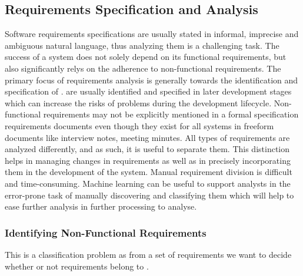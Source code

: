 \subsection{Requirements Specification and Analysis}

Software requirements specifications are usually stated in informal, imprecise and ambiguous natural language, thus analyzing them is a challenging task. 
The success of a system does not solely depend on its functional requirements, but also significantly relys on the
adherence to non-functional requirements. The primary focus of requirements analysis is
generally towards the identification and specification of \FR. \NFR are usually
identified and specified in later development stages which can increase the
risks of problems during the development lifecycle. Non-functional requirements may not be explicitly mentioned in a formal
specification requirements documents even though they exist for all
systems in freeform documents like interview notes,
meeting minutes.
All types of requirements are analyzed differently, and as such, it is
useful to separate them. This distinction helps in managing changes in
requirements as well as in precisely incorporating them in the development of
the system. Manual requirement division %
is difficult and time-consuming. 
Machine learning can be
useful to support analysts in the error-prone task of manually discovering and
classifying them which will help to ease further analysis in further processing to analyse.

\subsubsection{Identifying Non-Functional Requirements}
This
is a classification problem as from a set of requirements we want to decide
whether or not requirements belong to \NFR . 

